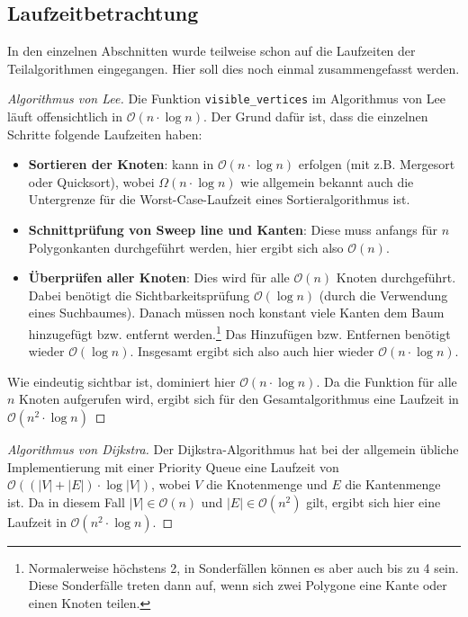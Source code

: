 \documentclass[a4paper, notitlepage, 12pt]{scrartcl}
\begin{document}
 \subsection{Laufzeitbetrachtung}
 In den einzelnen Abschnitten wurde teilweise schon auf die Laufzeiten der Teilalgorithmen eingegangen. Hier soll dies noch einmal zusammengefasst werden.
 \begin{proof}[Algorithmus von Lee]
 	Die Funktion \texttt{visible\_vertices} im Algorithmus von Lee läuft offensichtlich in $\mathcal{O}(n \cdot \log n)$. Der Grund dafür ist, dass die einzelnen Schritte folgende Laufzeiten haben:
 	\begin{itemize}
 		\item \textbf{Sortieren der Knoten}: kann in $\mathcal{O}(n \cdot \log n)$ erfolgen (mit z.B. Mergesort oder Quicksort), wobei $\Omega(n \cdot \log n)$ wie allgemein bekannt auch die Untergrenze für die Worst-Case-Laufzeit eines Sortieralgorithmus ist.
 		\item  \textbf{Schnittprüfung von Sweep line und Kanten}: Diese muss anfangs für $n$ Polygonkanten durchgeführt werden, hier ergibt sich also $\mathcal{O}(n)$.
 		\item  \textbf{Überprüfen aller Knoten}: Dies wird für alle $\mathcal{O}(n)$ Knoten durchgeführt. Dabei benötigt die Sichtbarkeitsprüfung $\mathcal{O}(\log n)$ (durch die Verwendung eines Suchbaumes). Danach müssen noch konstant viele Kanten dem Baum hinzugefügt bzw. entfernt werden.\footnote{Normalerweise höchstens 2, in Sonderfällen können es aber auch bis zu 4 sein. Diese Sonderfälle treten dann auf, wenn sich zwei Polygone eine Kante oder einen Knoten teilen.} Das Hinzufügen bzw. Entfernen benötigt wieder $\mathcal{O}(\log n)$. Insgesamt ergibt sich also auch hier wieder $\mathcal{O}(n \cdot \log n)$.
 	\end{itemize}
 	Wie eindeutig sichtbar ist, dominiert hier $\mathcal{O}(n \cdot \log n)$. Da die Funktion für alle $n$ Knoten aufgerufen wird, ergibt sich für den Gesamtalgorithmus eine Laufzeit in $\mathcal{O}(n^2 \cdot \log n)$
 \end{proof}
\begin{proof}[Algorithmus von Dijkstra]
	Der Dijkstra-Algorithmus hat bei der allgemein übliche Implementierung mit einer Priority Queue eine Laufzeit von $\mathcal{O}((|V|+|E|) \cdot \log |V|)$, wobei $V$ die Knotenmenge und $E$ die Kantenmenge ist. Da in diesem Fall $|V| \in \mathcal{O}(n)$ und $|E| \in \mathcal{O}(n^2)$ gilt, ergibt sich hier eine Laufzeit in $\mathcal{O}(n^2 \cdot \log n)$.
\end{proof}
\end{document}
